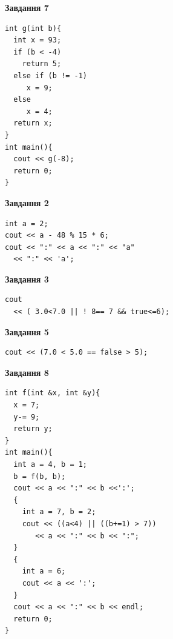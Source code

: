 \documentclass[12pt, ukrainian]{article}
\begin{document}
{\begin {large}
\begin{minipage}[t]{7.0cm}
\begin{center}
\textbf{Завдання 7}
\end{center}
\vspace{-8mm}

\begin{verbatim}
int g(int b){
  int x = 93;
  if (b < -4)
    return 5;
  else if (b != -1)
     x = 9;
  else
     x = 4;
  return x;
}
int main(){
  cout << g(-8);
  return 0;
}
\end{verbatim}

\end{minipage}
\vline \hspace{1mm}
\begin{minipage}[t]{11.0cm}

\begin{center}
\textbf{Завдання 2}
\end{center}
\vspace{-8mm}

\begin{verbatim}
int a = 2;
cout << a - 48 % 15 * 6;
cout << ":" << a << ":" << "a" 
  << ":" << 'a';
\end{verbatim}



\begin{center}
\textbf{Завдання 3}
\end{center}
\vspace{-8mm}

\begin{verbatim}
cout 
  << ( 3.0<7.0 || ! 8== 7 && true<=6);
\end{verbatim}



\begin{center}
\textbf{Завдання 5}
\end{center}
\vspace{-8mm}

\begin{verbatim}
cout << (7.0 < 5.0 == false > 5);
\end{verbatim}



\begin{center}
\textbf{Завдання 8}
\end{center}
\vspace{-8mm}

\begin{verbatim}
int f(int &x, int &y){
  x = 7;
  y-= 9;
  return y;
}
int main(){
  int a = 4, b = 1;
  b = f(b, b);
  cout << a << ":" << b <<':';
  {
    int a = 7, b = 2;
    cout << ((a<4) || ((b+=1) > 7))
       << a << ":" << b << ":";
  }
  {
    int a = 6;
    cout << a << ':';
  }
  cout << a << ":" << b << endl;
  return 0;
}
\end{verbatim}


\end{minipage}
\end{large}}
\end{document}
